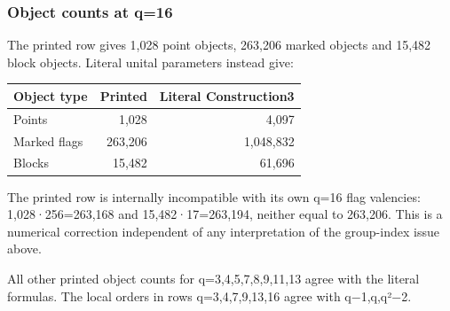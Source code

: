 \subsubsection{Object counts at q=16}\label{object-counts-at-q16}

The printed row gives 1,028 point objects, 263,206 marked objects and
15,482 block objects. Literal unital parameters instead give:

{\def\LTcaptype{none} %
\begin{longtable}[]{@{}lrr@{}}
\toprule\noalign{}
Object type & Printed & Literal Construction3 \\
\midrule\noalign{}
\endhead
\bottomrule\noalign{}
\endlastfoot
Points & 1,028 & 4,097 \\
Marked flags & 263,206 & 1,048,832 \\
Blocks & 15,482 & 61,696 \\
\end{longtable}
}

The printed row is internally incompatible with its own q=16 flag
valencies: 1,028·256=263,168 and 15,482·17=263,194, neither equal to
263,206. This is a numerical correction independent of any
interpretation of the group-index issue above.

All other printed object counts for q=3,4,5,7,8,9,11,13 agree with the
literal formulas. The local orders in rows q=3,4,7,9,13,16 agree with
q−1,q,q²−2.
